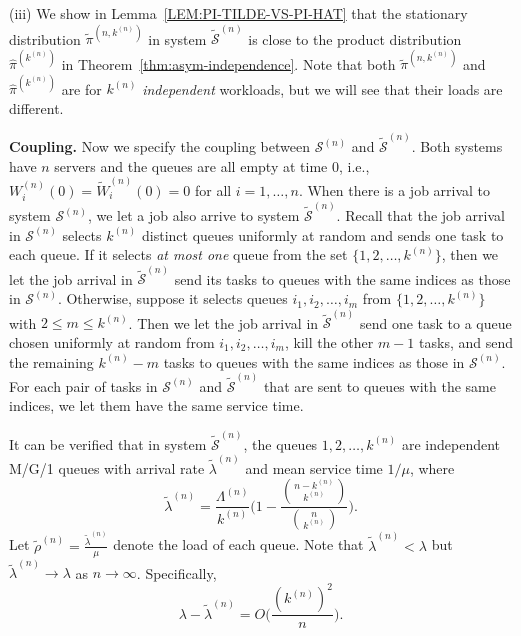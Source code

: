 \documentclass[sigconf]{acmart}
\newcommand{\supn}{^{(n)}}
\begin{document}
(iii) We show in Lemma~\ref{LEM:PI-TILDE-VS-PI-HAT} that the stationary distribution $\widetilde{\pi}^{(n,k\supn)}$ in system $\widetilde{\mathcal{S}}\supn$ is close to the product distribution $\hat{\pi}^{(k\supn)}$ in Theorem~\ref{thm:asym-independence}. Note that both $\widetilde{\pi}^{(n,k\supn)}$ and $\hat{\pi}^{(k\supn)}$ are for $k\supn$ \emph{independent} workloads, but we will see that their loads are different.



\textbf{Coupling.}
Now we specify the coupling between $\mathcal{S}\supn$ and $\widetilde{\mathcal{S}}\supn$.  Both systems have $n$ servers and the queues are all empty at time $0$, i.e., $W\supn_i(0)=\widetilde{W}\supn_i(0)=0$ for all $i=1,\dots,n$.  When there is a job arrival to system $\mathcal{S}\supn$, we let a job also arrive to system $\widetilde{\mathcal{S}}\supn$.  Recall that the job arrival in $\mathcal{S}\supn$ selects $k\supn$ distinct queues uniformly at random and sends one task to each queue. If it selects \emph{at most one} queue from the set $\bigl\{1,2,\dots,k\supn\bigr\}$, then we let the job arrival in $\widetilde{\mathcal{S}}\supn$ send its tasks to queues with the same indices as those in $\mathcal{S}\supn$.  Otherwise, suppose it selects queues $i_1,i_2,\dots,i_m$ from $\bigl\{1,2,\dots,k\supn\bigr\}$ with $2\le m\le k\supn$.  Then we let the job arrival in $\widetilde{\mathcal{S}}\supn$ send one task to a queue chosen uniformly at random from $i_1,i_2,\dots,i_m$, kill the other $m-1$ tasks, and send the remaining $k\supn-m$ tasks to queues with the same indices as those in $\mathcal{S}\supn$.  For each pair of tasks in $\mathcal{S}\supn$ and $\widetilde{\mathcal{S}}\supn$ that are sent to queues with the same indices, we let them have the same service time.

It can be verified that in system $\widetilde{\mathcal{S}}\supn$, the queues $1,2,\dots,k\supn$ are independent M/G/1 queues with arrival rate $\widetilde{\lambda}\supn$ and mean service time $1/\mu$, where
\begin{equation}\label{eq:lambda-tilde}
\widetilde{\lambda}\supn=\frac{\Lambda\supn}{k\supn}\Biggl(1-\frac{\binom{n-k\supn}{k\supn}}{\binom{n}{k\supn}}\Biggr).
\end{equation}
Let $\widetilde{\rho}\supn=\frac{\widetilde{\lambda}\supn}{\mu}$ denote the load of each queue. Note that $\widetilde{\lambda}\supn < \lambda$ but $\widetilde{\lambda}\supn\to\lambda$ as $n\to\infty$.  Specifically,
\begin{equation*}
\lambda-\widetilde{\lambda}\supn=O\biggl(\frac{(k\supn)^2}{n}\biggr).
\end{equation*}
\end{document}
